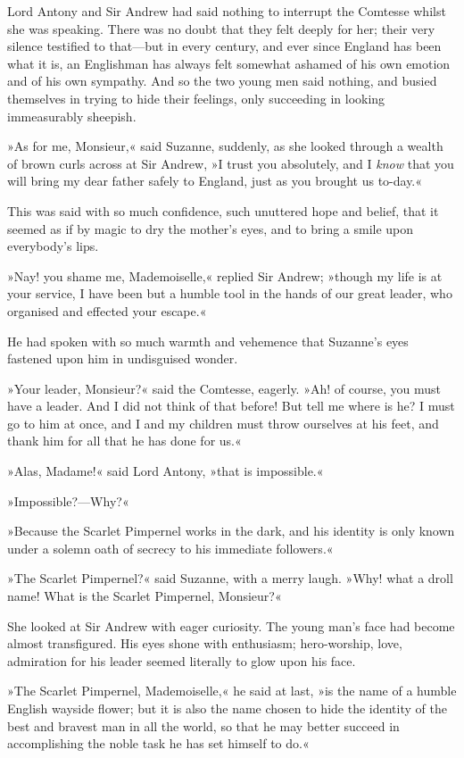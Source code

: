 Lord Antony and Sir Andrew had said nothing to interrupt the Comtesse whilst she was speaking. There was no doubt that they felt deeply for her; their very silence testified to that—but in every century, and ever since England has been what it is, an Englishman has always felt somewhat ashamed of his own emotion and of his own sympathy. And so the two young men said nothing, and busied themselves in trying to hide their feelings, only succeeding in looking immeasurably sheepish.

»As for me, Monsieur,« said Suzanne, suddenly, as she looked through a wealth of brown curls across at Sir Andrew, »I trust you absolutely, and I \textit{know} that you will bring my dear father safely to England, just as you brought us to-day.«

This was said with so much confidence, such unuttered hope and belief, that it seemed as if by magic to dry the mother's eyes, and to bring a smile upon everybody's lips.

»Nay! you shame me, Mademoiselle,« replied Sir Andrew; »though my life is at your service, I have been but a humble tool in the hands of our great leader, who organised and effected your escape.«

He had spoken with so much warmth and vehemence that Suzanne's eyes fastened upon him in undisguised wonder.

»Your leader, Monsieur?« said the Comtesse, eagerly. »Ah! of course, you must have a leader. And I did not think of that before! But tell me where is he? I must go to him at once, and I and my children must throw ourselves at his feet, and thank him for all that he has done for us.«

»Alas, Madame!« said Lord Antony, »that is impossible.«

»Impossible?—Why?«

»Because the Scarlet Pimpernel works in the dark, and his identity is only known under a solemn oath of secrecy to his immediate followers.«

»The Scarlet Pimpernel?« said Suzanne, with a merry laugh. »Why! what a droll name! What is the Scarlet Pimpernel, Monsieur?«

She looked at Sir Andrew with eager curiosity. The young man's face had become almost transfigured. His eyes shone with enthusiasm; hero-worship, love, admiration for his leader seemed literally to glow upon his face.

»The Scarlet Pimpernel, Mademoiselle,« he said at last, »is the name of a humble English wayside flower; but it is also the name chosen to hide the identity of the best and bravest man in all the world, so that he may better succeed in accomplishing the noble task he has set himself to do.«

